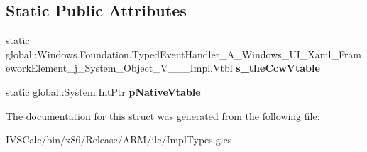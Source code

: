 \subsection*{Static Public Attributes}
\begin{DoxyCompactItemize}
\item 
\mbox{\label{struct_windows_1_1_foundation_1_1_typed_event_handler___a___windows___u_i___xaml___framework_ele872ac08da67cec047eb0ef56a7d78c65_acc90d4d88e417fb8a8fcd821016abc5c}} 
static global\+::\+Windows.\+Foundation.\+Typed\+Event\+Handler\+\_\+\+A\+\_\+\+Windows\+\_\+\+U\+I\+\_\+\+Xaml\+\_\+\+Framework\+Element\+\_\+j\+\_\+\+System\+\_\+\+Object\+\_\+\+V\+\_\+\+\_\+\+\_\+\+Impl.\+Vtbl {\bfseries s\+\_\+the\+Ccw\+Vtable}
\item 
\mbox{\label{struct_windows_1_1_foundation_1_1_typed_event_handler___a___windows___u_i___xaml___framework_ele872ac08da67cec047eb0ef56a7d78c65_a34bcdf268717fab8235d910cb48976e8}} 
static global\+::\+System.\+Int\+Ptr {\bfseries p\+Native\+Vtable}
\end{DoxyCompactItemize}


The documentation for this struct was generated from the following file\+:\begin{DoxyCompactItemize}
\item 
I\+V\+S\+Calc/bin/x86/\+Release/\+A\+R\+M/ilc/Impl\+Types.\+g.\+cs\end{DoxyCompactItemize}
